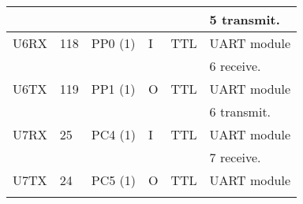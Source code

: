 \begin{table}[H]
\begin{tabular}{|l|l|l|l|l|l|}
 & & & & & 5 transmit. \\
\hline
U6RX & 118 & PP0 (1) & I & TTL & UART module\\
 & & & & &  6 receive. \\
\hline
U6TX & 119 & PP1 (1) & O & TTL & UART module\\
 & & & & &  6 transmit.\\
\hline
U7RX & 25 & PC4 (1) & I & TTL & UART module \\
 & & & & &  7 receive.\\
\hline
U7TX & 24 & PC5 (1) & O & TTL & UART module\\
 & & & & & \\
\hline
\end{tabular}
\end{table}



 



